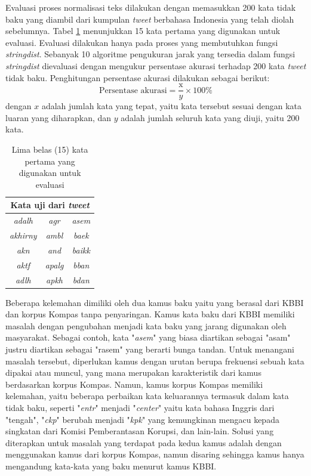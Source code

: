 Evaluasi proses normalisasi teks dilakukan dengan memasukkan 200 kata tidak baku yang diambil dari kumpulan \textit{tweet} berbahasa Indonesia yang telah diolah sebelumnya. Tabel \ref{tbl:ipb_tweet} menunjukkan 15 kata pertama yang digunakan untuk evaluasi. Evaluasi dilakukan hanya pada proses yang membutuhkan fungsi \textit{stringdist}. Sebanyak 10 algoritme pengukuran jarak yang tersedia dalam fungsi \textit{stringdist} dievaluasi dengan mengukur persentase akurasi terhadap 200 kata \textit{tweet} tidak baku. Penghitungan persentase akurasi dilakukan sebagai berikut:
\begin{equation*}
	\text{Persentase akurasi}=\frac{\text{x}}{y} \times 100\%
\end{equation*}
\noindent
dengan $x$ adalah jumlah kata yang tepat, yaitu kata tersebut sesuai dengan kata luaran yang diharapkan, dan $y$ adalah jumlah seluruh kata yang diuji, yaitu 200 kata.
\begin{table}[ht]
	\captionsetup{justification=justified,singlelinecheck=false}
	\caption{Lima belas (15) kata pertama yang digunakan untuk evaluasi \parencite{saragih2017normalisasi}}
    \label{tbl:ipb_tweet}
    \centering
	\begin{tabular}{|c|c|c|}
		\hline
		\multicolumn{3}{|c|}{\textbf{Kata uji dari \textit{tweet}}} \\ \hline
		\textit{adalh} & \textit{agr} & \textit{asem} \\ 
		\textit{akhirny} & \textit{ambl} & \textit{baek} \\ 
		\textit{akn} & \textit{and} & \textit{baikk} \\ 
		\textit{aktf} & \textit{apalg} & \textit{bban} \\ 
		\textit{adlh} & \textit{apkh} & \textit{bdan} \\ \hline
	\end{tabular}
\end{table}

Beberapa kelemahan dimiliki oleh dua kamus baku yaitu yang berasal dari KBBI dan korpus Kompas tanpa penyaringan. Kamus kata baku dari KBBI memiliki masalah dengan pengubahan menjadi kata baku yang jarang digunakan oleh masyarakat. Sebagai contoh, kata "\textit{asem}" yang biasa diartikan sebagai "asam" justru diartikan sebagai "rasem" yang berarti bunga tandan. Untuk menangani masalah tersebut, diperlukan kamus dengan urutan berupa frekuensi sebuah kata dipakai atau muncul, yang mana merupakan karakteristik dari kamus berdasarkan korpus Kompas. Namun, kamus korpus Kompas memiliki kelemahan, yaitu beberapa perbaikan kata keluarannya termasuk dalam kata tidak baku, seperti "\textit{entr}" menjadi "\textit{center}" yaitu kata bahasa Inggris dari "tengah", "\textit{ckp}" berubah menjadi "\textit{kpk}" yang kemungkinan mengacu kepada singkatan dari Komisi Pemberantasan Korupsi, dan lain-lain. Solusi yang diterapkan untuk masalah yang terdapat pada kedua kamus adalah dengan menggunakan kamus dari korpus Kompas, namun disaring sehingga kamus hanya mengandung kata-kata yang baku menurut kamus KBBI.

